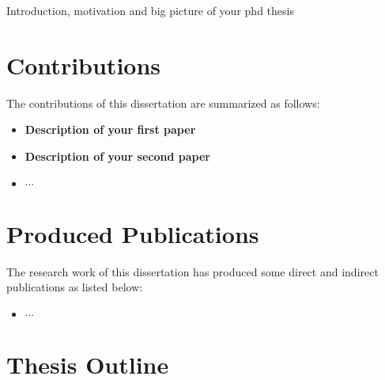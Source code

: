 Introduction, motivation and big picture of your phd thesis

\section{Contributions}
The contributions of this dissertation are summarized as follows:
\begin{itemize}[leftmargin=*]
    \item \textbf{Description of your first paper}\\
    \item \textbf{Description of your second paper}\\
    \item $\cdots$
\end{itemize}


\section{Produced Publications}
The research work of this dissertation has produced some direct and indirect publications as listed below:
\begin{itemize}
    \item $\cdots$
\end{itemize}


\section{Thesis Outline}

